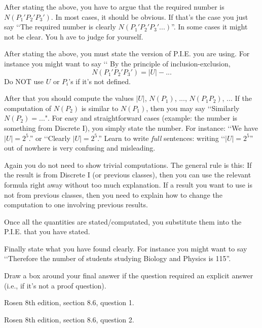 After stating the above, you have to argue that the 
required number is $N(P_1' P_2' P_3')$.
In most cases, it should be obvious.
If that's the case you just say
\lq\lq The required number is clearly $N(P_1' P_2' P_3' ...)$''.
In some cases it might not be clear.
You h ave to judge for yourself.

After stating the above, you must state the version of P.I.E. you are
using. For instance you might want to say \lq\lq
By the principle of inclusion-exclusion,
\[
N(P_1' P_2' P_3') = |U| - ...
\]
Do NOT use $U$ or $P_i$'s if it's not defined.

After that you should compute the values $|U|$, $N(P_1)$, ..., $N(P_1P_2)$, ...
If the computation of $N(P_2)$ is similar to $N(P_1)$, then 
you may say \lq\lq Similarly $N(P_2) = ...$".
For easy and straightforward cases (example: the number is something from
Discrete I), you simply state the number. For instance:
\lq\lq We have $|U| = 2^5$.'' or \lq\lq Clearly $|U| = 2^5$.''
Learn to write \textit{full} sentences: 
writing \lq\lq $|U| = 2^5$'' out of nowhere
is very confusing and misleading.

Again you do not need to show trivial computations.
The general rule is this: 
If the result is from Discrete I (or previous classes), then you can use the
relevant formula right away without too much explanation.
If a result you want to use is not from previous classes,
then you need to explain how to change the computation to one
involving previous results.

Once all the quantities are stated/computated, you substitute
them into the P.I.E. that you have stated.

Finally state what you have found clearly.
For instance you might want to say \lq\lq Therefore
the number of students studying Biology and Physics is 115''.

Draw a box around your final answer if the question required
an explicit answer (i.e., if it's not a proof question).

\newpage
\nextq Rosen 8th edition, section 8.6, question 1.

\SOLUTION



\newpage
\nextq Rosen 8th edition, section 8.6, question 2.

\SOLUTION




